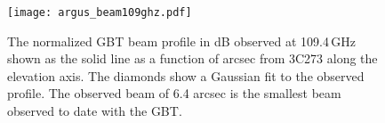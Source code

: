 \documentclass[12pt]{article}
\begin{document}
\begin{figure}[t]
\texttt{[image: argus\_beam109ghz.pdf]}
\vspace*{-3cm}
\caption{The normalized GBT beam profile in dB observed at 109.4\,GHz
  shown as the solid line as a function of arcsec from 3C273 along the
  elevation axis.  The diamonds show a Gaussian fit to the observed
  profile.  The observed beam of 6.4 arcsec is the smallest beam
  observed to date with the GBT.}
\end{figure}
\end{document}

